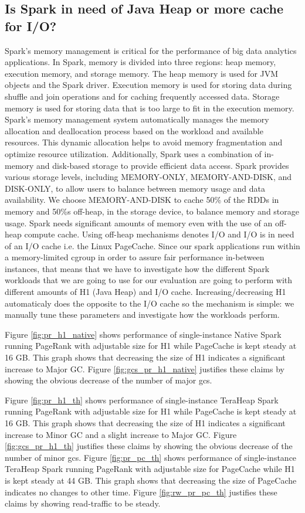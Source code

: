 \subsection{Is Spark in need of Java Heap or more cache for I/O?}

Spark's memory management is critical for the performance of big data
analytics applications. In Spark, memory is divided into three
regions: heap memory, execution memory, and storage memory. The heap
memory is used for JVM objects and the Spark driver. Execution memory
is used for storing data during shuffle and join operations and for
caching frequently accessed data. Storage memory is used for storing
data that is too large to fit in the execution memory. Spark's memory
management system automatically manages the memory allocation and
deallocation process based on the workload and available resources.
This dynamic allocation helps to avoid memory fragmentation and
optimize resource utilization. Additionally, Spark uses a combination
of in-memory and disk-based storage to provide efficient data access.
Spark provides various storage levels, including MEMORY-ONLY,
MEMORY-AND-DISK, and DISK-ONLY, to allow users to balance between
memory usage and data availability. We choose MEMORY-AND-DISK to cache
50\% of the RDDs in memory and 50\%s off-heap, in the storage device,
to balance memory and storage usage. Spark needs significant amounts
of memory even with the use of an off-heap compute cache. Using
off-heap mechanisms denotes I/O and I/O is in need of an I/O cache
i.e. the Linux PageCache. Since our spark applications run within a
memory-limited cgroup in order to assure fair performance in-between
instances, that means that we have to investigate how the different
Spark workloads that we are going to use for our evaluation are going
to perform with different amounts of H1 (Java Heap) and I/O cache.
Increasing/decreasing H1 automaticaly does the opposite to the I/O
cache so the mechanism is simple: we manually tune these parameters
and investigate how the workloads perform. 

Figure \ref{fig:pr_h1_native} shows performance of single-instance Native Spark
running PageRank with adjustable size for H1 while PageCache is kept
steady at 16 GB. This graph shows that decreasing the size of H1
indicates a significant increase to Major GC.
Figure \ref{fig:gcs_pr_h1_native} justifies these claims by showing the obvious
decrease of the number of major gcs.


Figure \ref{fig:pr_h1_th} shows performance of single-instance TeraHeap Spark
running PageRank with adjustable size for H1 while PageCache is kept
steady at 16 GB. This graph shows that decreasing the size of H1
indicates a significant increase to Minor GC and a slight increase to
Major GC. Figure \ref{fig:gcs_pr_h1_th} justifies these claims by showing the obvious
decrease of the number of minor gcs. 
Figure \ref{fig:pr_pc_th} shows performance of
single-instance TeraHeap Spark running PageRank with adjustable size
for PageCache while H1 is kept steady at 44 GB. This graph shows that
decreasing the size of PageCache indicates no changes to other time.
Figure \ref{fig:rw_pr_pc_th} justifies these claims by showing read-traffic to be steady.
 

